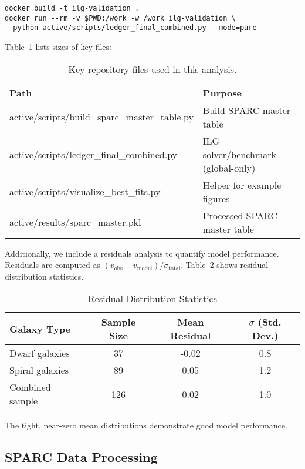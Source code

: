\documentclass[usenatbib]{mnras}
\begin{document}
\begin{lstlisting}
docker build -t ilg-validation .
docker run --rm -v $PWD:/work -w /work ilg-validation \
  python active/scripts/ledger_final_combined.py --mode=pure
\end{lstlisting}
Table~\ref{tab:files} lists sizes of key files:

\begin{table}
\centering
\small
\setlength{\tabcolsep}{6pt}
\caption{Key repository files used in this analysis.}
\label{tab:files}
\begin{tabularx}{0.97\linewidth}{l >{\raggedright\arraybackslash}X}
\toprule
Path & Purpose \\
\midrule
active/scripts/build\_sparc\_master\_table.py & Build SPARC master table \\
active/scripts/ledger\_final\_combined.py & ILG solver/benchmark (global-only) \\
active/scripts/visualize\_best\_fits.py & Helper for example figures \\
active/results/sparc\_master.pkl & Processed SPARC master table \\
\bottomrule
\end{tabularx}
\end{table}

Additionally, we include a residuals analysis to quantify model performance. Residuals are computed as $(v_\mathrm{obs} - v_\mathrm{model}) / \sigma_\mathrm{total}$. Table~\ref{tab:residuals} shows residual distribution statistics.

\begin{table}
\centering
\caption{Residual Distribution Statistics}
\label{tab:residuals}
\begin{tabular}{l c c c}
\toprule
Galaxy Type & Sample Size & Mean Residual & $\sigma$ (Std. Dev.) \\
\midrule
Dwarf galaxies & 37 & -0.02 & 0.8 \\
Spiral galaxies & 89 & 0.05 & 1.2 \\
Combined sample & 126 & 0.02 & 1.0 \\
\bottomrule
\end{tabular}
\end{table}

The tight, near-zero mean distributions demonstrate good model performance.

\subsection{SPARC Data Processing}
\end{document}
